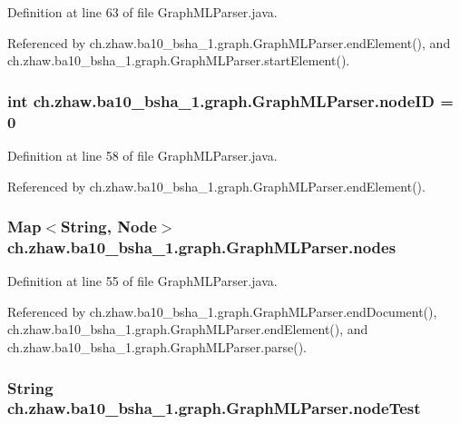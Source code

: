 Definition at line 63 of file GraphMLParser.java.

Referenced by ch.zhaw.ba10\_\-bsha\_\-1.graph.GraphMLParser.endElement(), and ch.zhaw.ba10\_\-bsha\_\-1.graph.GraphMLParser.startElement().\hypertarget{classch_1_1zhaw_1_1ba10__bsha__1_1_1graph_1_1GraphMLParser_a5761f7b6b239f00aba8a3d2d93cc093c}{
\subsubsection[{nodeID}]{\setlength{\rightskip}{0pt plus 5cm}int {\bf ch.zhaw.ba10\_\-bsha\_\-1.graph.GraphMLParser.nodeID} = 0}}
\label{classch_1_1zhaw_1_1ba10__bsha__1_1_1graph_1_1GraphMLParser_a5761f7b6b239f00aba8a3d2d93cc093c}


Definition at line 58 of file GraphMLParser.java.

Referenced by ch.zhaw.ba10\_\-bsha\_\-1.graph.GraphMLParser.endElement().\hypertarget{classch_1_1zhaw_1_1ba10__bsha__1_1_1graph_1_1GraphMLParser_ac367709d47f36449600550ee700271c5}{
\subsubsection[{nodes}]{\setlength{\rightskip}{0pt plus 5cm}Map$<$String, {\bf Node}$>$ {\bf ch.zhaw.ba10\_\-bsha\_\-1.graph.GraphMLParser.nodes}}}
\label{classch_1_1zhaw_1_1ba10__bsha__1_1_1graph_1_1GraphMLParser_ac367709d47f36449600550ee700271c5}


Definition at line 55 of file GraphMLParser.java.

Referenced by ch.zhaw.ba10\_\-bsha\_\-1.graph.GraphMLParser.endDocument(), ch.zhaw.ba10\_\-bsha\_\-1.graph.GraphMLParser.endElement(), and ch.zhaw.ba10\_\-bsha\_\-1.graph.GraphMLParser.parse().\hypertarget{classch_1_1zhaw_1_1ba10__bsha__1_1_1graph_1_1GraphMLParser_a80dbdb8f56f9fdee9a0471acdc0078eb}{
\subsubsection[{nodeTest}]{\setlength{\rightskip}{0pt plus 5cm}String {\bf ch.zhaw.ba10\_\-bsha\_\-1.graph.GraphMLParser.nodeTest}}}
\label{classch_1_1zhaw_1_1ba10__bsha__1_1_1graph_1_1GraphMLParser_a80dbdb8f56f9fdee9a0471acdc0078eb}


